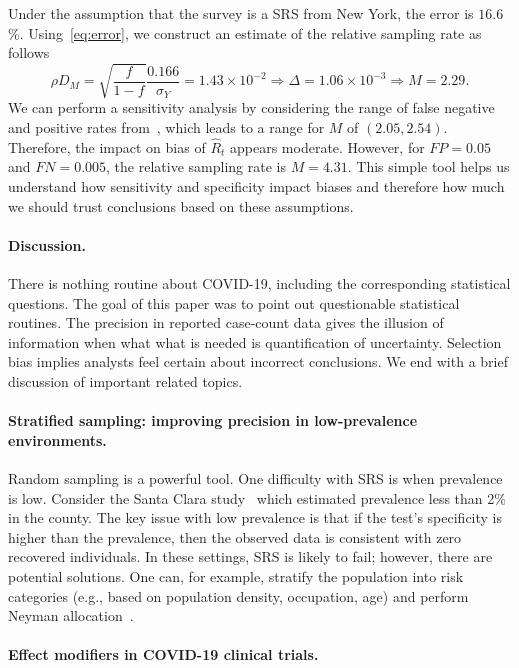 \documentclass[12pt]{article}
\begin{document}
Under the assumption that the survey is a SRS from New York, the error is $16.6$\%.  Using~\eqref{eq:error}, we construct an estimate of the relative sampling rate as follows
\[
\rho D_M = \sqrt{\frac{f}{1-f}} \frac{\text{0.166}}{\sigma_Y} = 1.43 \times 10^{-2} \Rightarrow \Delta = 1.06 \times 10^{-3} \Rightarrow M = 2.29.
\]
We can perform a sensitivity analysis by considering the range of false negative and positive rates from~\cite{Bendavid2020}, which leads to a range for $M$ of $(2.05, 2.54)$.  Therefore, the impact on bias of $\hat R_t$ appears moderate.  However, for $FP = 0.05$ and $FN = 0.005$, the relative sampling rate is $M=4.31$.  This simple tool helps us understand how sensitivity and specificity impact biases and  therefore how much we should trust conclusions based on these assumptions.

\paragraph*{Discussion.}
There is nothing routine about COVID-19, including the corresponding statistical questions.  The goal of this paper was to point out questionable statistical routines.  The precision in reported case-count data gives the illusion of information when what what is needed is quantification of uncertainty. Selection bias implies analysts feel certain about incorrect conclusions.  We end with a brief discussion of important related topics.

\paragraph*{Stratified sampling: improving precision in low-prevalence environments.}
Random sampling is a powerful tool.  One difficulty with SRS is when prevalence is low.  Consider the Santa Clara study~\cite{Bendavid2020} which estimated prevalence less than 2\% in the county.  The key issue with low prevalence is that if the test's specificity is higher than the prevalence, then the observed data is consistent with zero recovered individuals. In these settings, SRS is likely to fail; however, there are potential solutions.  One can, for example, stratify the population into risk categories (e.g., based on population density, occupation, age) and perform Neyman allocation~\cite{Cochran77}.

\paragraph*{Effect modifiers in COVID-19 clinical trials.}
\end{document}
